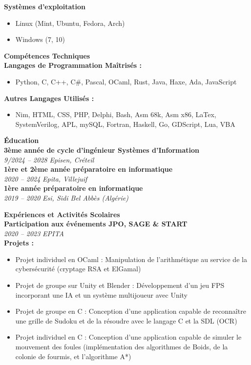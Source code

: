 \documentclass[a4paper,11pt]{article}
\newcommand{\cvsection}[1]{\vspace{1em}\noindent\textbf{\textcolor{cvhighlight}{\LARGE #1}}\vspace{0.5em}\\}
\newcommand{\cvevent}[3]{\textbf{#1} \\ \textit{#2} \hfill \textit{#3} \vspace{0.5em}}
\newcommand{\cvitem}[1]{\item #1}
\begin{document}
\begin{paracol}{2}
\colorbox{sectionbg1}{
    \parbox{\linewidth}{
        \cvsection{\faDesktop \hspace{0em} Systèmes d'exploitation}
        \vspace{-1em}
        \begin{itemize}[leftmargin=0.5cm, itemsep=0pt, topsep=0pt]
            \cvitem{Linux (Mint, Ubuntu, Fedora, Arch)}
            \cvitem{Windows (7, 10)}
        \end{itemize}
    }
}
\medskip

\colorbox{sectionbg2}{
    \parbox{\linewidth}{
        \cvsection{\faCode \hspace{0.5em} Compétences Techniques}
        \textbf{Langages de Programmation Maîtrisés :}
        \begin{itemize}[leftmargin=0.5cm, itemsep=0pt, topsep=0pt]
            \cvitem{Python, C, C++, C\#, Pascal, OCaml, Rust, Java, Haxe, Ada, JavaScript}
        \end{itemize}
        \textbf{Autres Langages Utilisés :}
        \begin{itemize}[leftmargin=0.5cm, itemsep=0pt, topsep=0pt]
            \cvitem{Nim, HTML, CSS, PHP, Delphi, Bash, Asm 68k, Asm x86, LaTex, SystemVerilog, APL, mySQL, Fortran, Haskell, Go, GDScript, Lua, VBA}
        \end{itemize}
    }
}
\medskip

\switchcolumn

\colorbox{sectionbg1}{
    \parbox{\linewidth}{
        \cvsection{\faGraduationCap \hspace{0.5em} Éducation}
        \cvevent{3ème année de cycle d'ingénieur Systèmes d’Information}{9/2024 – 2028}{Episen, Créteil} \\
        \cvevent{1ère et 2ème année préparatoire en informatique}{2020 – 2024}{Epita, Villejuif} \\
        \cvevent{1ère année préparatoire en informatique}{2019 – 2020}{Esi, Sidi Bel Abbès (Algérie)}
    }
}
\medskip

\colorbox{sectionbg2}{
    \parbox{\linewidth}{
        \cvsection{\faBriefcase \hspace{0.5em} Expériences et Activités Scolaires}
        \cvevent{Participation aux événements JPO, SAGE \& START}{2020 – 2023}{EPITA} \\
        \textbf{Projets :}
        \begin{itemize}[leftmargin=0.5cm, itemsep=0pt, topsep=0pt]
            \cvitem{Projet individuel en OCaml : Manipulation de l'arithmétique au service de la cybersécurité (cryptage RSA et ElGamal)}
            \cvitem{Projet de groupe sur Unity et Blender : Développement d'un jeu FPS incorporant une IA et un système multijoueur avec Unity}
            \cvitem{Projet de groupe en C : Conception d'une application capable de reconnaître une grille de Sudoku et de la résoudre avec le langage C et la SDL (OCR)}
            \cvitem{Projet individuel en C : Conception d'une application capable de simuler le mouvement des foules (implémentation des algorithmes de Boids, de la colonie de fourmis, et l'algorithme A*)}
        \end{itemize}
    }
}
\medskip


\end{paracol}
\end{document}
